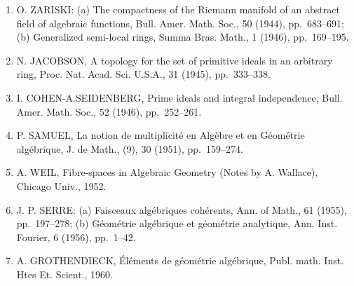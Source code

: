 \begin{enumerate}
\item
  O. ZARISKI: (a) The compactness of the Riemann manifold of an abstract field of algebraic functions, Bull. Amer. Math. Soc., 50 (1944), pp.~683--691; (b) Generalized semi-local rings, Summa Bras. Math., 1 (1946), pp.~169--195.
\item
  N. JACOBSON, A topology for the set of primitive ideals in an arbitrary ring, Proc. Nat. Acad. Sci. U.S.A., 31 (1945), pp.~333--338.
\item
  I. COHEN-A.SEIDENBERG, Prime ideals and integral independence, Bull. Amer. Math. Soc., 52 (1946), pp.~252--261.
\item
  P. SAMUEL, La notion de multiplicité en Algèbre et en Géométrie algébrique, J. de Math., (9), 30 (1951), pp.~159--274.
\item
  A. WEIL, Fibre-spaces in Algebraic Geometry (Notes by A. Wallace), Chicago Univ., 1952.
\item
  J. P. SERRE: (a) Faisceaux algébriques cohérents, Ann. of Math., 61 (1955), pp.~197--278; (b) Géométrie algébrique et géométrie analytique, Ann. Inst. Fourier, 6 (1956), pp.~1--42.
\item
  A. GROTHENDIECK, Éléments de géométrie algébrique, Publ. math. Inst. Htes Et. Scient., 1960.
\end{enumerate}

